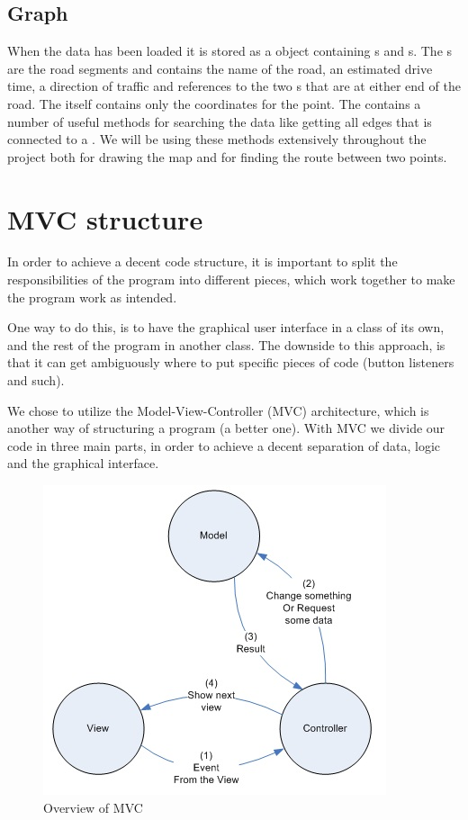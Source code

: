 \subsection{Graph}
\label{BG-DS-G}
When the data has been loaded it is stored as a  object containing 
s and s. The s are the 
road segments and contains the name of the road, an estimated drive time, 
a direction of traffic and references to the two s that are at 
either end of the road.  The  itself contains only the coordinates 
for the point. The  contains a number of useful methods for 
searching the data like getting all edges that is connected to a . 
We will be using these methods extensively throughout the project both for 
drawing the map and for finding the route between two points.

\section{MVC structure}
\label{BG-MVC}
In order to achieve a decent code structure, it is important to split the 
responsibilities of the program into different pieces, which work together 
to make the program work as intended.

One way to do this, is to have the graphical user interface in a class of its
own, and the rest of the program in another class. The downside to this
approach, is that it can get ambiguously where to put specific pieces of code
(button listeners and such).

We chose to utilize the Model-View-Controller (MVC) architecture, which is
another way of structuring a program (a better one). With MVC we divide our code
in three main parts, in order to achieve a decent separation of data, logic and
the graphical interface.

\begin{figure}[h!]
\centering
\includegraphics[width=0.5\linewidth]{images/mvc}
\caption{Overview of MVC}
\label{mvc-overview}
\end{figure}

